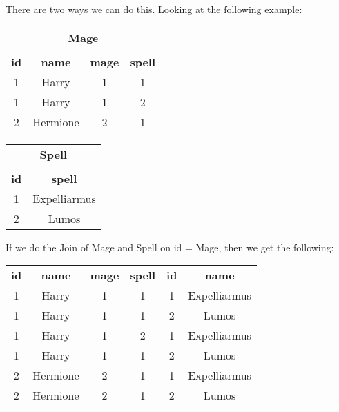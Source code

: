 \documentclass[11pt,a4paper,titlepage,dvipsnames,cmyk]{scrartcl}
\begin{document}
There are two ways we can do this. Looking at the following example:

\begin{center}
    \begin{tabular}{|c|c|c|c|}
        \multicolumn{4}{c}{\textbf{Mage}} \\
        \multicolumn{4}{c}{} \\
        \hline
        \textbf{id} & \textbf{name} & \textbf{mage} & \textbf{spell} \\
        \hhline{|=|=|=|=|}
        1 & Harry & 1 & 1 \\ \hline
        1 & Harry & 1 & 2 \\ \hline
        2 & Hermione & 2 & 1 \\ \hline
    \end{tabular}
\end{center}

\begin{center}
    \begin{tabular}{|c|c|}
        \multicolumn{2}{c}{\textbf{Spell}} \\
        \multicolumn{2}{c}{} \\
        \hline
        \textbf{id} & \textbf{spell} \\ \hhline{|=|=|}
        1 & Expelliarmus \\ \hline
        2 & Lumos \\ \hline
    \end{tabular}
\end{center}

If we do the Join of Mage and Spell on id = Mage, then we get the
following:
\begin{center}
    \begin{tabular}{|c|c|c|c|c|c|}
        \hline
        \textbf{id} & \textbf{name} & \textbf{mage} & \textbf{spell} &
        \textbf{id} & \textbf{name} \\ \hhline{|=|=|=|=|=|=|}
        1 & Harry & 1 & 1 & 1 & Expelliarmus \\ \hline
        \color{red}\st{1} & \color{red}\st{Harry} & \color{red}\st{1} &
        \color{red}\st{1} & \color{red}\st{2} & \color{red}\st{Lumos} \\ \hline
        \color{red}\st{1} & \color{red}\st{Harry} & \color{red}\st{1} &
        \color{red}\st{2} & \color{red}\st{1} & \color{red}\st{Expelliarmus} \\ \hline
        1 & Harry & 1 & 1 & 2 & Lumos \\
        \hline
        2 & Hermione & 2 & 1 & 1 & Expelliarmus \\ \hline
        \color{red}\st{2} & \color{red}\st{Hermione} & \color{red}\st{2} & \color{red}\st{1} & \color{red}\st{2} & \color{red}\st{Lumos} \\ \hline

    \end{tabular}
\end{center}
\end{document}
